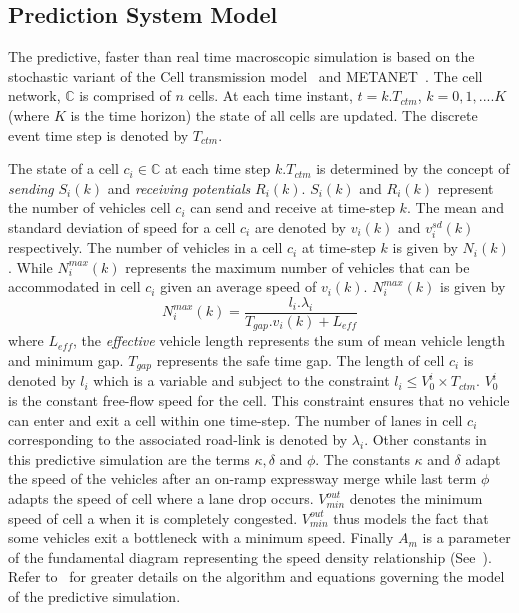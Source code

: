 \documentclass{wscpaperproc}
\theoremstyle{wsc}
\begin{document}
\subsection{Prediction System Model}
\label{subsec:pred-system-model}

The predictive, faster than real time macroscopic simulation is based on the stochastic variant of the Cell transmission model~ and METANET~. The cell network, $\mathbb{C}$ is comprised of $n$ cells. At each time instant, $t=k.T_{ctm}$, $k=0,1, .... K$ (where $K$ is the time horizon) the state of all cells are updated. The discrete event time step is denoted by $T_{ctm}$.
  
The state of a cell $c_i\in \mathbb{C}$ at each time step $k.T_{ctm}$ is determined by the concept of {\it sending} $S_i(k)$ and {\it receiving potentials} $R_i(k)$. $S_i(k)$ and $R_i(k)$ represent the number of vehicles cell $c_i$ can send and receive at time-step $k$. The mean and standard deviation of speed for a cell $c_i$ are denoted by $v_i(k)$ and $v_i^{sd}(k)$ respectively.  The number of vehicles in a cell $c_i$ at time-step $k$ is given by $N_{i}(k)$. While $N_i^{max}(k)$ represents the maximum number of vehicles that can be accommodated in cell $c_i$ given an average speed of $v_i(k)$. $N_i^{max}(k)$ is given by
\begin{equation}
\label{eq:nmax}
N_i^{max}(k)=\frac{l_i.\lambda_i}{T_{gap}.v_{i}(k)+ L_{eff}}
\end{equation}
where $L_{eff}$, the {\it effective} vehicle length represents the sum of mean vehicle length and minimum gap. $T_{gap}$ represents the safe time gap.
The length of cell $c_i$ is denoted by $l_i$ which is a variable and subject to the constraint $l_i \le V_0^i\times T_{ctm}$. $V_0^i$ is the constant free-flow speed for the cell. This constraint ensures that no vehicle can enter and exit a cell within one time-step. The number of lanes in cell $c_i$ corresponding to the associated road-link is denoted by $\lambda_i$. Other constants in this predictive simulation are the terms $\kappa, \delta$ and $\phi$. The constants $\kappa$ and $\delta$ adapt the speed of the vehicles after an on-ramp expressway merge while last term $\phi$ adapts the speed of cell where a lane drop occurs. $V^{out}_{min}$ denotes the minimum speed of cell a when it is completely congested. $V^{out}_{min}$ thus models the fact that some vehicles exit a bottleneck with a minimum speed. Finally $A_{m}$ is a parameter of the fundamental diagram representing the speed density relationship (See~). Refer to~ for greater details on the algorithm and equations governing the model of the predictive simulation.
\end{document}

